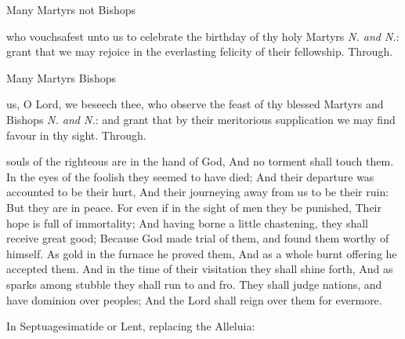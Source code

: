 \collect\label{CommonMartyrsICollect}
\begin{inhead}
	Many Martyrs not Bishops
\end{inhead}
 who vouchsafest unto us to celebrate the birthday of thy holy Martyrs
\textit{N. and N.}: grant that we may rejoice in the everlasting felicity of their fellowship. Through.

\begin{inhead}
	Many Martyrs Bishops
\end{inhead}
 us, O Lord, we beseech thee, who observe the feast of thy blessed Martyrs and Bishops \textit{N. and N.}: and grant that by their meritorious supplication we may find favour in thy sight. Through.

\label{Wisdom31}\label{CommonMartyrsIEpistle}
 souls of the righteous are in the hand of God, And no torment shall touch them. In the eyes of the foolish they seemed to have died; And their departure was accounted to be their hurt, And their journeying away from us to be their ruin: But they are in peace. For even if in the sight of men they be punished, Their hope is full of immortality; And having borne a little chastening, they shall receive great good; Because God made trial of them, and found them worthy of himself. As gold in the furnace he proved them, And as a whole burnt offering he accepted them. And in the time of their visitation they shall shine forth, And as sparks among stubble they shall run to and fro. They shall judge nations, and have dominion over peoples; And the Lord shall reign over them for evermore. 


\begin{rubric}
{In Septuagesimatide or Lent, replacing the Alleluia:}
\end{rubric}

\vspace{-1ex}


